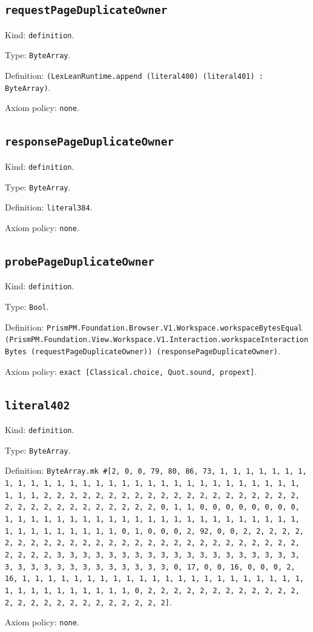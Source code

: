\documentclass[11pt]{article}
\begin{document}
\subsection*{\texttt{requestPageDuplicateOwner}}
\noindent Kind: \texttt{definition}.\par
\noindent Type: \texttt{ByteArray}.\par
\noindent Definition: \texttt{(LexLeanRuntime.append (literal400) (literal401) : ByteArray)}.\par
\noindent Axiom policy: \texttt{none}.\par
\subsection*{\texttt{responsePageDuplicateOwner}}
\noindent Kind: \texttt{definition}.\par
\noindent Type: \texttt{ByteArray}.\par
\noindent Definition: \texttt{literal384}.\par
\noindent Axiom policy: \texttt{none}.\par
\subsection*{\texttt{probePageDuplicateOwner}}
\noindent Kind: \texttt{definition}.\par
\noindent Type: \texttt{Bool}.\par
\noindent Definition: \texttt{PrismPM.Foundation.Browser.V1.Workspace.workspaceBytesEqual (PrismPM.Foundation.View.Workspace.V1.Interaction.workspaceInteractionBytes (requestPageDuplicateOwner)) (responsePageDuplicateOwner)}.\par
\noindent Axiom policy: \texttt{exact [Classical.choice, Quot.sound, propext]}.\par
\subsection*{\texttt{literal402}}
\noindent Kind: \texttt{definition}.\par
\noindent Type: \texttt{ByteArray}.\par
\noindent Definition: \texttt{ByteArray.mk \#[2, 0, 0, 79, 80, 86, 73, 1, 1, 1, 1, 1, 1, 1, 1, 1, 1, 1, 1, 1, 1, 1, 1, 1, 1, 1, 1, 1, 1, 1, 1, 1, 1, 1, 1, 1, 1, 1, 1, 1, 2, 2, 2, 2, 2, 2, 2, 2, 2, 2, 2, 2, 2, 2, 2, 2, 2, 2, 2, 2, 2, 2, 2, 2, 2, 2, 2, 2, 2, 2, 2, 2, 0, 1, 1, 0, 0, 0, 0, 0, 0, 0, 0, 1, 1, 1, 1, 1, 1, 1, 1, 1, 1, 1, 1, 1, 1, 1, 1, 1, 1, 1, 1, 1, 1, 1, 1, 1, 1, 1, 1, 1, 1, 1, 1, 0, 1, 0, 0, 0, 2, 92, 0, 0, 2, 2, 2, 2, 2, 2, 2, 2, 2, 2, 2, 2, 2, 2, 2, 2, 2, 2, 2, 2, 2, 2, 2, 2, 2, 2, 2, 2, 2, 2, 2, 2, 3, 3, 3, 3, 3, 3, 3, 3, 3, 3, 3, 3, 3, 3, 3, 3, 3, 3, 3, 3, 3, 3, 3, 3, 3, 3, 3, 3, 3, 3, 3, 3, 0, 17, 0, 0, 16, 0, 0, 0, 2, 16, 1, 1, 1, 1, 1, 1, 1, 1, 1, 1, 1, 1, 1, 1, 1, 1, 1, 1, 1, 1, 1, 1, 1, 1, 1, 1, 1, 1, 1, 1, 1, 1, 0, 2, 2, 2, 2, 2, 2, 2, 2, 2, 2, 2, 2, 2, 2, 2, 2, 2, 2, 2, 2, 2, 2, 2, 2, 2]}.\par
\noindent Axiom policy: \texttt{none}.\par
\end{document}
